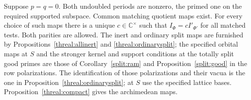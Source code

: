 \begin{theorem}\label{threal:base}
Suppose \(p=q=0\). Both undoubled periods are nonzero, the primed
one on the required supported subspace. Common matching quotient
maps exist. For every choice of such maps there is a unique
\(c\in\mathbb C^\times\) such that \(I_\Phi=cI'_{\Phi'}\) for
all matched tests. Both parities are allowed. The inert and ordinary
split maps are furnished by Propositions~\ref{threal:allinert} and
\ref{threal:ordinarysplit}; the specified orbital maps at \(S\)
and the stronger kernel and support conditions at the totally split
good primes are those of Corollary~\ref{split:ram} and
Proposition~\ref{split:good} in the row polarizations. The
identification of those polarizations and their vacua is the one
in Proposition~\ref{threal:ordinarysplit}; at \(S\) use the
specified lattice bases. Proposition~\ref{threal:compact} gives
the archimedean maps.
\end{theorem}
